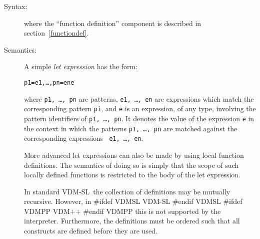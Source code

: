 \documentclass[\pformat,12pt]{article}
\newcommand{\vdmslpp}[2]{%
#ifdef VDMSL
#1
#endif VDMSL
#ifdef VDMPP
#2
#endif VDMPP
}
\newcommand{\vdmsl}{VDM-SL}
\newcommand{\vdmpp}{VDM++}
\begin{document}
\begin{description}
\item[Syntax:]





  \noindent where the ``function definition'' component is described in
  section~\ref{functiondef}.

\item[Semantics:] A simple {\it let expression} has the form:
  \begin{alltt}
     p1 = e1, \ldots, pn = en  e
  \end{alltt}
  where {\tt p1, \ldots, pn} are patterns, {\tt e1, \ldots, en} are
  expressions which match the corresponding pattern {\tt pi}, and
  {\tt e} is an expression, of any type, involving the pattern
  identifiers of {\tt p1, \ldots, pn}. It denotes the value of the
  expression {\tt e} in the context in which the patterns {\tt p1,
    \ldots, pn} are matched against the corresponding expressions {\tt
    e1, \ldots, en}.

  More advanced let expressions can also be made by using local
  function definitions. The semantics of doing so is simply that the
  scope of such locally defined functions is restricted to the body of
  the let expression.

  In standard \vdmsl\ the collection of definitions may be mutually
  recursive.  However, in  \vdmslpp{\vdmsl}{\vdmpp} this is not
  supported by the interpreter.  Furthermore, the definitions must be
  ordered such that all constructs are defined before they are used.
     

\end{description}
\end{document}
